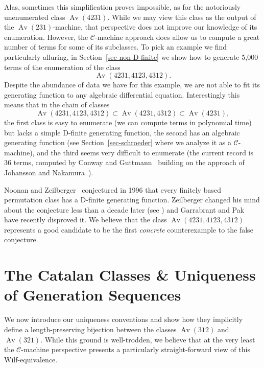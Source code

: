 \documentclass[10pt]{article}
\theoremstyle{plain}
\theoremstyle{definition}
\newcommand{\Av}{\operatorname{Av}}
\newcommand{\C}{\mathcal{C}}
\begin{document}
Alas, sometimes this simplification proves impossible, as for the notoriously unenumerated class $\Av(4231)$. While we may view this class as the output of the $\Av(231)$-machine, that perspective does not improve our knowledge of its enumeration. However, the $\C$-machine approach does allow us to compute a great number of terms for some of its subclasses. To pick an example we find particularly alluring, in Section~\ref{sec-non-D-finite} we show how to generate 5,000 terms of the enumeration of the class
\[
	\Av(4231,4123,4312).
\]
Despite the abundance of data we have for this example, we are not able to fit its generating function to any algebraic differential equation. Interestingly this means that in the chain of classes
\[
	\Av(4231,4123,4312)
	\subset
	\Av(4231,4312)
	\subset
	\Av(4231),
\]
the first class is easy to enumerate (we can compute terms in polynomial time) but lacks a simple D-finite generating function, the second has an algebraic generating function (see Section~\ref{sec-schroeder} where we analyze it as a $\C$-machine), and the third seems very difficult to enumerate (the current record is 36 terms, computed by Conway and Guttmann~\cite{conway:on-the-growth-r:} building on the approach of Johansson and Nakamura~\cite{johansson:using-functiona:}).

Noonan and Zeilberger~\cite{noonan:the-enumeration:} conjectured in 1996 that every finitely based permutation class has a D-finite generating function. Zeilberger changed his mind about the conjecture less than a decade later (see \cite{elder:problems-and-co:}) and Garrabrant and Pak~\cite{Garrabrant:Pattern-avoidan:} have recently disproved it. We believe that the class $\Av(4231,4123,4312)$ represents a good candidate to be the first \emph{concrete} counterexample to the false conjecture.

\section{The Catalan Classes \& Uniqueness of Generation Sequences}
\label{sec-catalan}

We now introduce our uniqueness conventions and show how they implicitly define a length-preserving bijection between the classes $\Av(312)$ and $\Av(321)$. While this ground is well-trodden, we believe that at the very least the $\C$-machine perspective presents a particularly straight-forward view of this Wilf-equivalence.
\end{document}

